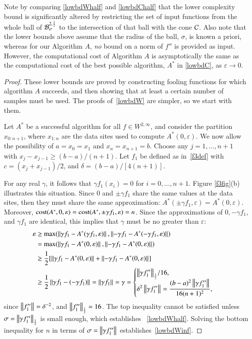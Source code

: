 \documentclass[review]{elsarticle}
\newcommand{\abstol}{\varepsilon}
\theoremstyle{definition}
\renewcommand{\cw}{W}
\begin{document}
Note by comparing \eqref{lowbdWhalf} and \eqref{lowbdChalf} that the lower complexity
bound is significantly altered by restricting the
set of input functions from the whole ball of $ \cb^{2,\frac 12}_{\sigma}$ to the 
intersection of that ball with the cone $\cc$. Also note that the lower bounds above 
assume that the radius of the ball, $\sigma$, is known a priori, whereas for our Algorithm 
$A$, \emph{no} bound on a norm of $f''$ is provided as  input. However, the
computational cost of Algorithm $A$ is asymptotically
the same as the computational cost of the best possible algorithm, $A^*$ in
\eqref{lowbdC}, as $\abstol \to 0$.

\begin{proof}
	These lower bounds are proved by constructing fooling functions for which
	algorithm $A$ succeeds, and then showing that at least a certain number of
	samples must be used. The proofs of~\eqref{lowbdW} are simpler, so
	we start with them.
		
	Let $A^*$ be a successful algorithm for all $f \in \cw^{2,\infty}$, and consider
	the partition $x_{0:n+1}$, where $x_{1:n}$ are the data sites
	used to compute $A^*(0,\abstol)$.  We now allow the possibility of $a = x_0=x_1$
	and $x_n = x_{n+1} = b$. Choose any $j=1, \ldots, n+1$ with
	$x_j-x_{j-1} \ge (b-a)/(n+1)$. Let $f_1$ be defined as in~\eqref{f3def} with $c
	= (x_j+x_{j-1})/2$, and $\delta = (b-a)/[4(n+1)]$.
	
	For any real $\gamma$, it follows that $\gamma f_1(x_i)=0$ for $i=0, \ldots,
	n+1$. Figure \ref{f3fig}(b) illustrates this situation. Since $0$ and $\pm
	\gamma f_1$ share the same values at the data sites, then they must share the
	same approximation: $A^*(\pm \gamma f_1,\abstol) = A^*(0,\abstol)$. Moreover,
	$\cost(A^*,0,\abstol) = \cost(A^*,\pm \gamma f_1,\abstol) = n$. Since the
	approximations of $0, -\gamma f_1$, and $\gamma f_1$ are identical, this implies that
	$\gamma$
	must be no greater than $\abstol$:
	\begin{align*}
	\abstol  &\ge \max(\norm{\gamma f_1 - A^*(\gamma f_1,\abstol)},
	\norm{-\gamma f_1 - A^*(-\gamma f_1,\abstol)}) \\
	&= \max(\norm{\gamma f_1 - A^*(0,\abstol)}, \norm{-\gamma f_1 - A^*(0,\abstol)}) \\
	& \ge \frac{1}{2} [\norm{\gamma f_1 - A^*(0,\abstol)}
	+ \norm{-\gamma f_1 - A^*(0,\abstol)}] \\
	& \ge \frac{1}{2} \norm{\gamma f_1 - (-\gamma f_1)} =  \norm{\gamma f_1}
	= \gamma %
	= \begin{cases} \displaystyle { \norm[\frac 12]{\gamma f_1''}}/{16} , \\
	\displaystyle \delta^2 	\norm{\gamma f_1''}
	=  \frac{(b-a)^2 \norm{\gamma f_1''}}{16(n+1)^2},
	\end{cases}
	\end{align*}
	since $\norm{f_1''} =  \delta^{-2}$,  and $\norm[\frac 12]{f_1''} = 16$. The top inequality
	cannot be satisfied unless $\sigma = \norm[\frac 12]{\gamma
	f_1''}$ is small enough, which establishes ~\eqref{lowbdWhalf}. Solving the
	bottom inequality for $n$ in terms of $\sigma = \norm{\gamma f_1''}$
	establishes~\eqref{lowbdWinf}.



\end{proof}
\end{document}
